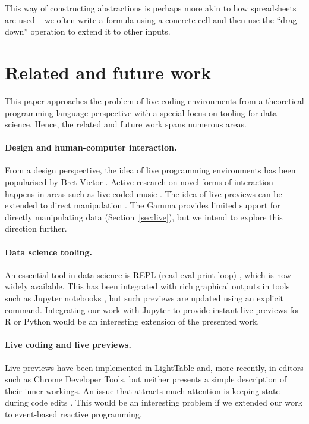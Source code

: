 \documentclass[acmsmall,anonymous,fleqn]{acmart}\settopmatter{printfolios=false,printccs=false,printacmref=false}
\theoremstyle{plain}
\theoremstyle{definition}
\begin{document}
This way of constructing abstractions is perhaps more akin to how spreadsheets are used -- we often
write a formula using a concrete cell and then use the ``drag down'' operation to extend it to
other inputs.


\section{Related and future work}
\label{sec:future}

This paper approaches the problem of live coding environments from a theoretical programming
language perspective with a special focus on tooling for data science. Hence, the related and
future work spans numerous areas.

\paragraph{Design and human-computer interaction.}
From a design perspective, the idea of live programming environments has been popularised by
Bret Victor \cite{learnable}. Active research on novel forms of interaction happens in areas
such as live coded music \cite{beyond,sonic}.
The idea of live previews can be extended to direct manipulation \cite{direct}. The Gamma
provides limited support for directly manipulating data (Section~\ref{sec:live}), but we
intend to explore this direction further.

\paragraph{Data science tooling.}
An essential tool in data science is REPL (read-eval-print-loop) \cite{drscheme}, which is now
widely available. This has been integrated with rich graphical outputs in tools such as Jupyter
notebooks \cite{jupyter,ipython}, but such previews are updated using an explicit command.
Integrating our work with Jupyter to provide instant live previews for R or Python would be
an interesting extension of the presented work.

\paragraph{Live coding and live previews.}
Live previews have been implemented in LightTable \cite{lighttable} and, more recently, in
editors such as Chrome Developer Tools, but neither presents a simple description of their
inner workings. An issue that attracts much attention is keeping state during code edits
\cite{alive,livingit}. This would be an interesting problem if we extended our work to
event-based reactive programming.
\end{document}
